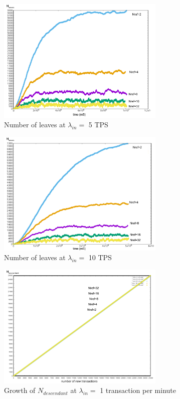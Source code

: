 \documentclass[a4paper,10pt,twocolumn]{article}
\begin{document}
 \begin{figure}[ht]
	\begin{center}
	\includegraphics[width=80mm]{5sec.png}
	  \caption{Number of leaves at \( \lambda_{in}=\) 5 TPS}
	\label{fig:sec5}
	\end{center}
 \end{figure}

 \begin{figure}[ht]
	\begin{center}
	\includegraphics[width=80mm]{10sec.png}
	  \caption{Number of leaves at \( \lambda_{in}=\) 10 TPS}
	\label{fig:sec10}
	\end{center}
 \end{figure}

 \begin{figure}[ht]
	\begin{center}
		\includegraphics[width=80mm]{1min_ref.png}
		\caption{Growth of \(N_{descendant}\) at \( \lambda_{in}=\) 1 transaction per minute}
	  \label{fig:min1_ref}
	\end{center}
 \end{figure}
\end{document}
